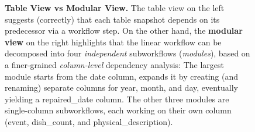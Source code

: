 \documentclass[conference]{ijdc-v14}
\newcommand{\ortoyw}{\textsf{or2yw}\xspace}
\newcommand{\openrefine}{\textrm{OpenRefine}\xspace}
\newcommand{\yw}{\textsf{YW}\xspace}
\newcommand{\co}[1]{\textsf{\small{#1}}}
\begin{document}
\begin{figure}[t]
\caption{\textbf{Table View vs Modular View.}  The table view on the left suggests (correctly) that
  each table snapshot depends on its predecessor via a workflow step. On the other hand, the \textbf{modular
  view} on the right highlights that the linear workflow can be decomposed into four \emph{independent}
  subworkflows (\emph{modules}), based on a finer-grained \emph{column-level} dependency
  analysis: The largest module starts from the \co{date} column, expands it by creating (and
  renaming) separate columns for \co{year}, \co{month}, and \co{day}, eventually yielding a
  \co{repaired\_date} column. The other three modules are single-column subworkflows, each working
  on their own column (\co{event}, \co{dish\_count}, and \co{physical\_description}).}  
    \label{fig:parallel_view}
\end{figure}




\end{document}

